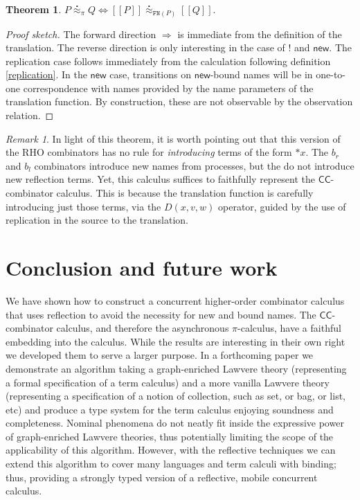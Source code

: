 \documentclass[submission,copyright,creativecommons]{eptcs}
\newcommand{\new}{\mathsf{new}}
\newcommand{\pic}{$\pi$-calculus}
\newcommand{\ccomb}{$\mathsf{CC}$-combinator calculus}
\newcommand{\ldb}{[\![}
\newcommand{\rdb}{]\!]}
\newcommand{\wbbisim}{\stackrel{\centerdot}{\approx}} %
\newcommand{\dropn}[1]{\mathsf{*}#1}
\theoremstyle{definition}
\newtheorem{theorem}{Theorem}
\theoremstyle{remark}
\newtheorem{remark}{Remark}
\theoremstyle{remark}
\begin{document}
\begin{theorem}
  $P \wbbisim_{\pi} Q \iff \ldb P \rdb \wbbisim_{\texttt{FN}(P)} \ldb Q \rdb$.
\end{theorem}

\begin{proof}[Proof sketch]
  The forward direction $\Rightarrow$ is immediate from the definition
  of the translation. The reverse direction is only interesting in the
  case of $!$ and $\mathsf{new}$. The replication case follows immediately
  from the calculation following definition \ref{replication}. 
  In the $\new$ case, transitions on $\mathsf{new}$-bound
  names will be in one-to-one correspondence with names provided by
  the name parameters of the translation function. By construction,
  these are not observable by the observation relation.
\end{proof}

\begin{remark}
  In light of this theorem, it is worth pointing out that this version
  of the RHO combinators has no rule for \emph{introducing} terms of
  the form $\dropn{x}$. The $b_r$ and $b_l$ combinators introduce new
  names from processes, but the do not introduce new reflection
  terms. Yet, this calculus suffices to faithfully represent the
  {\ccomb}. This is because the translation function is
  carefully introducing just those terms, via the $D(x,v,w)$ operator,
  guided by the use of replication in the source to the
  translation. 
\end{remark}

\section{Conclusion and future work}
We have shown how to construct a concurrent higher-order combinator
calculus that uses reflection to avoid the necessity for new and bound
names.  The {\ccomb}, and therefore the asynchronous {\pic}, have a
faithful embedding into the calculus. While the results are
interesting in their own right we developed them to serve a larger
purpose. In a forthcoming paper we demonstrate an algorithm taking a
graph-enriched Lawvere theory (representing a formal specification of
a term calculus) and a more vanilla Lawvere theory (representing a
specification of a notion of collection, such as set, or bag, or list,
etc) and produce a type system for the term calculus enjoying
soundness and completeness. Nominal phenomena do not neatly fit inside
the expressive power of graph-enriched Lawvere theories, thus
potentially limiting the scope of the applicability of this
algorithm. However, with the reflective techniques we can extend this
algorithm to cover many languages and term calculi with binding; thus,
providing a strongly typed version of a reflective, mobile concurrent
calculus.
\end{document}
